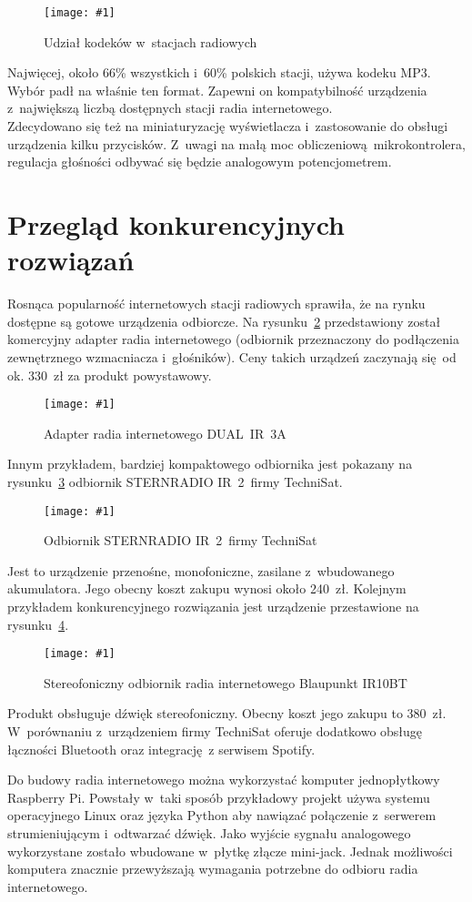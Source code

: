 \documentclass[polish]{aghengthesis}
\newcommand{\imgint}[4]{
	\begin{figure}[{#4}]
		\centering
		\texttt{[image: \#1]}
		\caption{#2}
		\label{#1}
	\end{figure}
}
\newcommand{\imgh}[3]{\imgint{#1}{#2}{#3}{H}}
\begin{document}
			\imgh{3/rb_chart_new}{Udział kodeków w~stacjach radiowych}{0.8}
			
			Najwięcej, około 66\% wszystkich i~60\% polskich stacji, używa kodeku MP3. Wybór padł na właśnie ten format.
			Zapewni on kompatybilność urządzenia z~największą liczbą dostępnych stacji radia internetowego.
			$ $\\
			
			Zdecydowano się też na miniaturyzację wyświetlacza i~zastosowanie do obsługi urządzenia kilku przycisków. Z~uwagi na małą moc obliczeniową mikrokontrolera, regulacja głośności odbywać się będzie analogowym potencjometrem.
		
	\section{Przegląd konkurencyjnych rozwiązań}
		Rosnąca popularność internetowych stacji radiowych sprawiła, że na rynku dostępne są gotowe urządzenia odbiorcze.
		Na rysunku~\ref{1/radio_adapter} przedstawiony został komercyjny adapter radia internetowego (odbiornik przeznaczony do podłączenia zewnętrznego wzmacniacza i~głośników). Ceny takich urządzeń zaczynają się od ok. 330~zł za produkt powystawowy. 
		\imgh{1/radio_adapter}{Adapter radia internetowego DUAL~IR~3A\textsuperscript{\cite{radio_adapter}}}{0.7}
		
		Innym przykładem, bardziej kompaktowego odbiornika jest pokazany na rysunku~\ref{1/radio_tanie} odbiornik STERNRADIO IR~2~firmy TechniSat.
		\imgh{1/radio_tanie}{Odbiornik STERNRADIO IR~2~firmy TechniSat\textsuperscript{\cite{radio_tanie}}}{0.7}
		Jest to urządzenie przenośne, monofoniczne, zasilane z~wbudowanego akumulatora. Jego obecny koszt zakupu wynosi około 240~zł.
		Kolejnym przykładem konkurencyjnego rozwiązania jest urządzenie przestawione na rysunku~\ref{1/radio_drogie}.
		\imgh{1/radio_drogie}{Stereofoniczny odbiornik radia internetowego Blaupunkt IR10BT\textsuperscript{\cite{radio_drogie}}}{0.7}
		Produkt obsługuje dźwięk stereofoniczny. Obecny koszt jego zakupu to 380~zł. W~porównaniu z~urządzeniem firmy TechniSat oferuje dodatkowo obsługę łączności Bluetooth oraz integrację z serwisem Spotify.
		
		Do budowy radia internetowego można wykorzystać komputer jednopłytkowy Raspberry Pi. Powstały w~taki sposób przykładowy projekt\textsuperscript{\cite{rpi_sbc_radio}} używa systemu operacyjnego Linux oraz języka Python aby nawiązać połączenie z~serwerem strumieniującym i~odtwarzać dźwięk. Jako wyjście sygnału analogowego wykorzystane zostało wbudowane w~płytkę złącze mini-jack.
		Jednak możliwości komputera znacznie przewyższają wymagania potrzebne do odbioru radia internetowego.
		$ $\\
		
\end{document}
